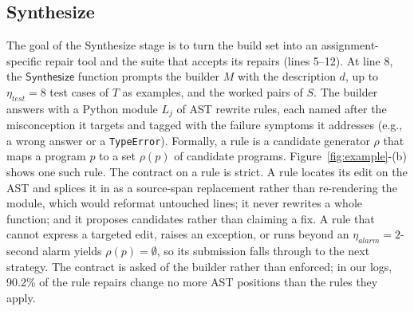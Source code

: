 \documentclass[acmsmall,screen,review,anonymous,nonacm]{acmart}
\newcommand{\aux}[1]{\ensuremath{\mathsf{#1}}}
\newcommand{\V}[1]{\ensuremath{\mathit{#1}}}
\begin{document}
\subsection{Synthesize}
\label{sec:synth}

The goal of the Synthesize stage is to turn the build set into an assignment-specific repair tool and the suite that accepts its repairs (lines 5--12). At line 8, the \aux{Synthesize} function prompts the builder $M$ with the description $d$, up to $\eta_{\V{test}} = 8$ test cases of $T$ as examples, and the worked pairs of $S$. The builder answers with a Python module $L_j$ of AST rewrite rules, each named after the misconception it targets and tagged with the failure symptoms it addresses (e.g., a wrong answer or a \texttt{TypeError}). Formally, a rule is a candidate generator $\rho$ that maps a program $p$ to a set $\rho(p)$ of candidate programs. Figure~\ref{fig:example}-(b) shows one such rule. The contract on a rule is strict. A rule locates its edit on the AST and splices it in as a source-span replacement rather than re-rendering the module, which would reformat untouched lines; it never rewrites a whole function; and it proposes candidates rather than claiming a fix. A rule that cannot express a targeted edit, raises an exception, or runs beyond an $\eta_{\V{alarm}} = 2$-second alarm yields $\rho(p) = \emptyset$, so its submission falls through to the next strategy. The contract is asked of the builder rather than enforced; in our logs, 90.2\% of the rule repairs change no more AST positions than the rules they apply.
\end{document}
